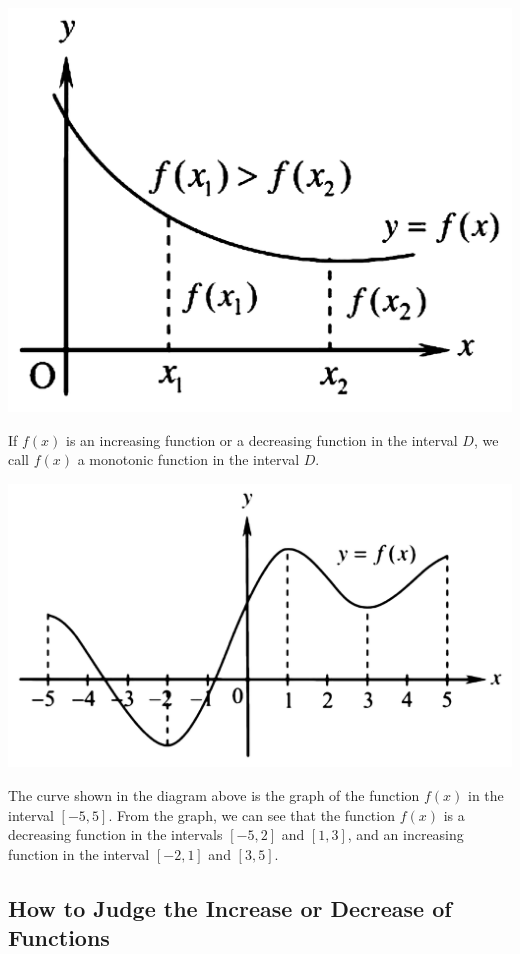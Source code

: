 \documentclass{report}
\begin{document}
\begin{enumerate}
\begin{center}
              \includegraphics[scale=0.25]{assets/26-3.png}
          \end{center}
\end{enumerate}
If $f(x)$ is an increasing function or a decreasing function in the interval $D$, we call $f(x)$ a monotonic function in the interval $D$.
\begin{center}
    \includegraphics[scale=0.25]{assets/26-4.png}
\end{center}
The curve shown in the diagram above is the graph of the function $f(x)$ in the
interval $[-5, 5]$. From the graph, we can see that the function $f(x)$ is a
decreasing function in the intervals $[-5, 2]$ and $[1, 3]$, and an increasing
function in the interval $[-2, 1]$ and $[3, 5]$.
\newpage

\subsection*{How to Judge the Increase or Decrease of Functions}
\end{document}
